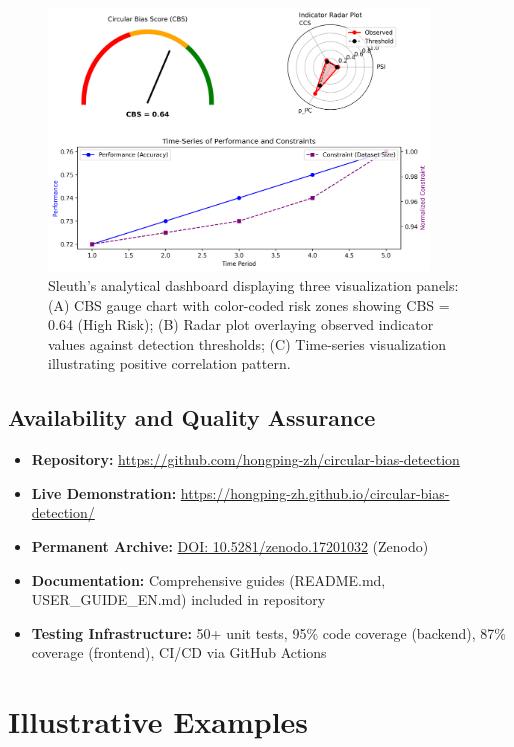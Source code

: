 \documentclass[10pt]{article}
\begin{document}
\begin{figure}[ht]
\centering
\includegraphics[width=0.9\textwidth]{fig1_main_interface.png}
\caption{Sleuth's analytical dashboard displaying three visualization panels: (A) CBS gauge chart with color-coded risk zones showing CBS = 0.64 (High Risk); (B) Radar plot overlaying observed indicator values against detection thresholds; (C) Time-series visualization illustrating positive correlation pattern.}
\label{fig:interface}
\end{figure}

\subsection{Availability and Quality Assurance}

\begin{itemize}
    \item \textbf{Repository:} \url{https://github.com/hongping-zh/circular-bias-detection}
    \item \textbf{Live Demonstration:} \url{https://hongping-zh.github.io/circular-bias-detection/}
    \item \textbf{Permanent Archive:} \href{https://doi.org/10.5281/zenodo.17201032}{DOI: 10.5281/zenodo.17201032} (Zenodo)
    \item \textbf{Documentation:} Comprehensive guides (README.md, USER\_GUIDE\_EN.md) included in repository
    \item \textbf{Testing Infrastructure:} 50+ unit tests, 95\% code coverage (backend), 87\% coverage (frontend), CI/CD via GitHub Actions
\end{itemize}

\section{Illustrative Examples}
\end{document}
